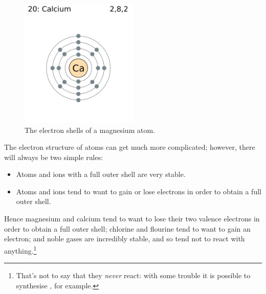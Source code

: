 \documentclass[a4paper]{memoir}
\begin{document}
\begin{figure}
  \centering
  \includegraphics[width=0.5\textwidth]{calciumshells}
  \caption{The electron shells of a magnesium atom.\label{fig:calciumshells}}
\end{figure}

The electron structure of atoms can get much more complicated; however, there will always be two simple rules:
\begin{itemize}
  \item Atoms and ions with a full outer shell are very stable.
  \item Atoms and ions tend to want to gain or lose electrons in order to obtain a full outer shell.
\end{itemize}

Hence magnesium and calcium tend to want to lose their two valence electrons in order to obtain a full outer shell; chlorine and flourine
tend to want to gain an electron; and noble gases are incredibly stable, and so tend not to react with anything.\footnote{That's not to say
that they \emph{never} react: with some trouble it is possible to synthesise , for example.}
\end{document}
